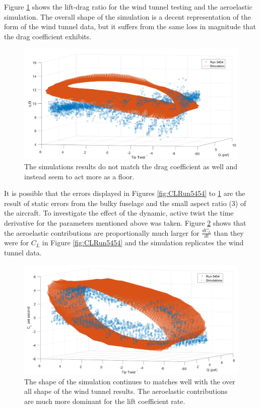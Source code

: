 \documentclass[11pt]{ucthesis}
\begin{document}
Figure \ref{fig:LDRun5454} shows the lift-drag ratio for the wind tunnel testing and the aeroelastic simulation. The overall shape of the simulation is a decent representation of the form of the wind tunnel data, but it suffers from the same loss in magnitude that the drag coefficient exhibits.

\begin{figure}[thpb]
\centering
\includegraphics[width=.75\linewidth]{Figures/LD5454.png}
\caption{The simulations results do not match the drag coefficient as well and instead seem to act more as a floor.}
\label{fig:LDRun5454}
\end{figure}

It is possible that the errors displayed in Figures \ref{fig:CLRun5454} to \ref{fig:LDRun5454} are the result of static errors from the bulky fuselage and the small aspect ratio (3) of the aircraft. To investigate the effect of the dynamic, active twist the time derivative for the parameters mentioned above was taken. Figure \ref{fig:dCLdtRun5454} shows that the aeroelastic contributions are proportionally much larger for $\frac{dC_L}{dt}$ than they were for $C_L$ in Figure \ref{fig:CLRun5454} and the simulation replicates the wind tunnel data.

\begin{figure}[thpb]
\centering
\includegraphics[width=.75\linewidth]{Figures/diffCL5454.png}
\caption{The shape of the simulation continues to matches well with the over all shape of the wind tunnel results. The aeroelastic contributions are much more dominant for the lift coefficient rate.}
\label{fig:dCLdtRun5454}
\end{figure}
\end{document}
